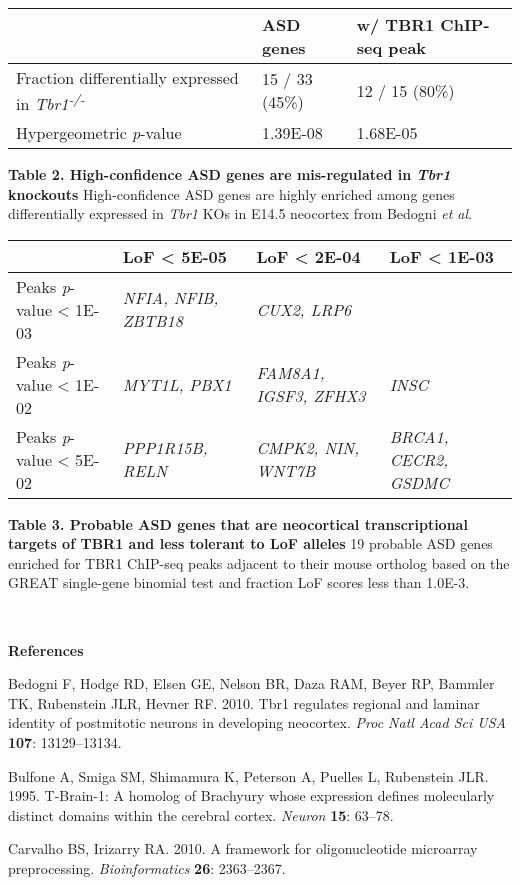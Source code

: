 \documentclass[]{article}
\begin{document}
\textbf{\\
}

\begin{longtable}[]{@{}lll@{}}
\toprule
~ & ASD genes & w/ TBR1 ChIP-seq peak\tabularnewline
\midrule
\endhead
Fraction differentially expressed in \emph{Tbr1\textsuperscript{-/-}} &
15 / 33 (45\%) & 12 / 15 (80\%)\tabularnewline
Hypergeometric \emph{p}-value & 1.39E-08 & 1.68E-05\tabularnewline
\bottomrule
\end{longtable}

\textbf{Table 2. High-confidence ASD genes are mis-regulated in
\emph{Tbr1} knockouts} High-confidence ASD genes are highly enriched
among genes differentially expressed in \emph{Tbr1} KOs in E14.5
neocortex from Bedogni \emph{et al}.

\begin{longtable}[]{@{}llll@{}}
\toprule
~ & LoF \textless{} 5E-05 & LoF \textless{} 2E-04 & LoF \textless{}
1E-03\tabularnewline
\midrule
\endhead
Peaks \emph{p}-value \textless{} 1E-03 & \emph{NFIA, NFIB, ZBTB18} &
\emph{CUX2, LRP6} & ~\tabularnewline
Peaks \emph{p}-value \textless{} 1E-02 & \emph{MYT1L, PBX1} &
\emph{FAM8A1, IGSF3, ZFHX3} & \emph{INSC}\tabularnewline
Peaks \emph{p}-value \textless{} 5E-02 & \emph{PPP1R15B, RELN} &
\emph{CMPK2, NIN, WNT7B} & \emph{BRCA1, CECR2, GSDMC}\tabularnewline
\bottomrule
\end{longtable}

\textbf{Table 3. Probable ASD genes that are neocortical transcriptional
targets of TBR1 and less tolerant to LoF alleles} 19 probable ASD genes
enriched for TBR1 ChIP-seq peaks adjacent to their mouse ortholog based
on the GREAT single-gene binomial test and fraction LoF scores less than
1.0E-3.

\textbf{\\
}

\textbf{References}

Bedogni F, Hodge RD, Elsen GE, Nelson BR, Daza RAM, Beyer RP, Bammler
TK, Rubenstein JLR, Hevner RF. 2010. Tbr1 regulates regional and laminar
identity of postmitotic neurons in developing neocortex. \emph{Proc Natl
Acad Sci USA} \textbf{107}: 13129--13134.

Bulfone A, Smiga SM, Shimamura K, Peterson A, Puelles L, Rubenstein JLR.
1995. T-Brain-1: A homolog of Brachyury whose expression defines
molecularly distinct domains within the cerebral cortex. \emph{Neuron}
\textbf{15}: 63--78.

Carvalho BS, Irizarry RA. 2010. A framework for oligonucleotide
microarray preprocessing. \emph{Bioinformatics} \textbf{26}: 2363--2367.
\end{document}

